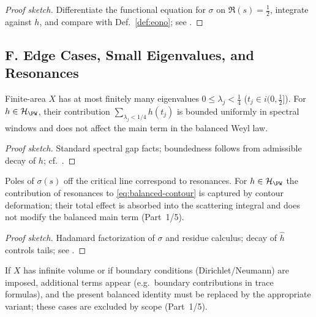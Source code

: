\begin{proof}[Proof sketch]
Differentiate the functional equation for $\sigma$ on $\Re(s)=\tfrac12$, integrate against $h$, and compare with Def.~\ref{def:eono}; see \cite{LaxPhillips1976}.
\end{proof}


\subsection*{F. Edge Cases, Small Eigenvalues, and Resonances}
\label{subsec:edge-cases}

\begin{lemma}
\label{lem:small-eigs}
Finite-area $X$ has at most finitely many eigenvalues $0\le \lambda_j<\tfrac14$ ($t_j\in i(0,\tfrac12]$). For $h\in \mathcal H_{\PW}$,
their contribution $\sum_{\lambda_j<1/4} h(t_j)$ is bounded uniformly in spectral windows and does not affect the main term in the balanced Weyl law.
\end{lemma}

\begin{proof}[Proof sketch]
Standard spectral gap facts; boundedness follows from admissible decay of $h$; cf.\ \cite{Iwaniec2002}.
\end{proof}

\begin{lemma}
\label{lem:resonances}
Poles of $\sigma(s)$ off the critical line correspond to resonances. For $h\in\mathcal H_{\PW}$ the contribution of resonances to \eqref{eq:balanced-contour} is captured by contour deformation; their total effect is absorbed into the scattering integral and does not modify the balanced main term (Part~1/5).
\end{lemma}

\begin{proof}[Proof sketch]
Hadamard factorization of $\sigma$ and residue calculus; decay of $\hat h$ controls tails; see \cite{Hejhal1983II}.
\end{proof}

\begin{remark}
If $X$ has infinite volume or if boundary conditions (Dirichlet/Neumann) are imposed, additional terms appear (e.g.\ boundary contributions in trace formulas), and the present balanced identity must be replaced by the appropriate variant; these cases are excluded by scope (Part~1/5).
\end{remark}

